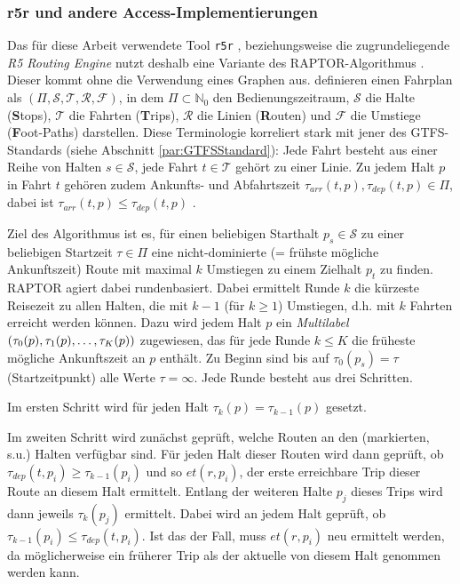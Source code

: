\documentclass[11pt,pdftex,a4paper]{scrartcl}
\begin{document}
	\subsubsection{r5r und andere Access-Implementierungen}
	Das für diese Arbeit verwendete Tool \texttt{r5r} \parencite{pereiraR5rRapidRealistic2021}, beziehungsweise die zugrundeliegende \textit{R5 Routing Engine} \parencites[\enquote{Rapid Realistic Routing on Real-world and Reimagined networks}][]{conwayEvidenceBasedTransitLand2017}{conwayAccountingUncertaintyVariation2018} nutzt deshalb eine Variante des RAPTOR-Algorithmus \parencite[Round-bAsed Public Transit Optimized Router, ][]{dellingRoundBasedPublicTransit2012}. Dieser kommt ohne die Verwendung eines Graphen aus. \textcite{dellingRoundBasedPublicTransit2012} definieren einen Fahrplan als $(\Pi, \mathcal{S}, \mathcal{T}, \mathcal{R}, \mathcal{F})$, in dem $\Pi\subset\mathbb{N}_0$ den Bedienungszeitraum, $\mathcal{S}$ die Halte (\textbf{S}tops), $\mathcal{T}$ die Fahrten (\textbf{T}rips), $\mathcal{R}$ die Linien (\textbf{R}outen) und $\mathcal{F}$ die Umstiege (\textbf{F}oot-Paths) darstellen. Diese Terminologie korreliert stark mit jener des GTFS-Standards (siehe Abschnitt \ref{par:GTFSStandard}): Jede Fahrt besteht aus einer Reihe von Halten $s\in\mathcal{S}$, jede Fahrt $t\in\mathcal{T}$ gehört zu einer Linie. Zu jedem Halt $p$ in Fahrt $t$ gehören zudem Ankunfts- und Abfahrtszeit $\tau_{arr} (t,p),\tau_{dep} (t,p)\in\Pi$, dabei ist $\tau_{arr}(t,p)\leq\tau_{dep}(t,p)$ \parencite[2]{dellingRoundBasedPublicTransit2012}. 
	
	Ziel des Algorithmus ist es, für einen beliebigen Starthalt $p_s\in\mathcal{S}$ zu einer beliebigen Startzeit $\tau\in\Pi$ eine nicht-dominierte (= frühste mögliche Ankunftszeit) Route mit maximal $k$ Umstiegen zu einem Zielhalt $p_t$ zu finden. RAPTOR agiert dabei rundenbasiert. Dabei ermittelt Runde $k$ die kürzeste Reisezeit zu allen Halten, die mit $k-1$ (für $k\geq1$) Umstiegen, d.h. mit $k$ Fahrten erreicht werden können. Dazu wird jedem Halt $p$ ein \textit{Multilabel} $(\tau_0(p),\tau_1(p),\mathellipsis,\tau_K(p))$ zugewiesen, das für jede Runde $k\leq K$ die früheste mögliche Ankunftszeit an $p$ enthält. Zu Beginn sind bis auf $\tau_0(p_s) = \tau$ (Startzeitpunkt) alle Werte $\tau=\infty$. Jede Runde besteht aus drei Schritten. 
	
	Im ersten Schritt wird für jeden Halt $\tau_k(p)=\tau_{k-1}(p)$ gesetzt.
	
	Im zweiten Schritt wird zunächst geprüft, welche Routen an den (markierten, s.u.) Halten verfügbar sind. Für jeden Halt dieser Routen wird dann geprüft, ob $\tau_{dep}(t, p_i)\geq\tau_{k-1}(p_i)$ und so $et(r,p_i)$, der erste erreichbare Trip dieser Route an diesem Halt ermittelt. Entlang der weiteren Halte $p_j$ dieses Trips wird dann jeweils $\tau_k(p_j)$ ermittelt. Dabei wird an jedem Halt geprüft, ob $\tau_{k-1}(p_i) \leq\tau_{dep}(t,p_i)$. Ist das der Fall, muss $et(r,p_i)$ neu ermittelt werden, da möglicherweise ein früherer Trip als der aktuelle von diesem Halt genommen werden kann. 
	
\end{document}
